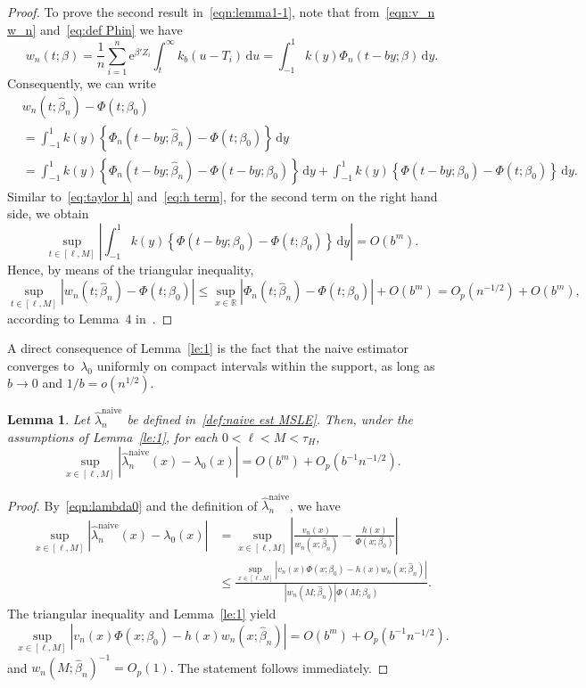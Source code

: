 \documentclass[11pt,reqno]{amsart}
\theoremstyle{definition}
\theoremstyle{plain}
\newtheorem{lemma}[de]{Lemma}
\theoremstyle{remark}
\begin{document}
\begin{proof}
To prove the second result in~\eqref{eqn:lemma1-1}, note that from~\eqref{eqn:v_n w_n} and~\eqref{eq:def Phin} we have
\begin{equation}
\label{eqn:w}
w_n(t;\beta)
=
\frac{1}{n}\sum_{i=1}^n
\mathrm{e}^{\beta'Z_i}\int_{t}^\infty k_b(u-T_i)\,\mathrm{d}u
=
\int_{-1}^1 k(y)\Phi_n(t-by;\beta)\,\mathrm{d}y.
\end{equation}
Consequently, we can write
\[
\begin{split}
&
w_n(t;\hat{\beta}_n)-\Phi(t;\beta_0)\\
&=
\int_{-1}^1 k(y)\left\{\Phi_n(t-by;\hat{\beta}_n)-\Phi(t;\beta_0)\right\}\,\mathrm{d}y\\
&=
\int_{-1}^1 k(y)
\left\{
\Phi_n(t-by;\hat{\beta}_n)-\Phi(t-by;\beta_0)
\right\}
\,\mathrm{d}y
+
\int_{-1}^1 k(y)
\left\{
\Phi(t-by;\beta_0)-\Phi(t;\beta_0)
\right\}
\,\mathrm{d}y.
\end{split}
\]
Similar to~\eqref{eq:taylor h} and~\eqref{eq:h term}, for the second term on the right hand side, we obtain
\[
\sup_{t\in[\ell,M]}
\left|
\int_{-1}^1 k(y)
\left\{
\Phi(t-by;\beta_0)-\Phi(t;\beta_0)
\right\}
\,\mathrm{d}y
\right|
=
O(b^m).
\]
Hence, by means of the triangular inequality,
\[
\sup_{t\in[\ell,M]}
\left|w_n(t;\hat{\beta}_n)-\Phi(t;\beta_0)\right|
\leq
\sup_{x\in{\mathbb{R}}}
\left|\Phi_n(t;\hat{\beta}_n)-\Phi(t;\beta_0)\right|
+
O(b^m)
=
O_p(n^{-1/2})+O(b^m),
\]
according to Lemma~4 in~\cite{LopuhaaNane2013}.
\end{proof}
A direct consequence of Lemma~\ref{le:1} is the fact that the naive estimator converges to~$\lambda_0$ uniformly on
compact intervals within the support, as long as $b\to0$ and $1/b=o(n^{1/2})$.
\begin{lemma}
\label{lem:cons-naive}
Let $\hat{\lambda}_n^{\mathrm{naive}}$ be defined in~\eqref{def:naive est MSLE}.
Then, under the assumptions of Lemma~\ref{le:1}, for each $0<\ell<M<\tau_H$,
\[
\sup_{x\in[\ell,M]}|\hat{\lambda}_n^{\mathrm{naive}}(x)-\lambda_0(x)|
=
O(b^{m})+O_p(b^{-1}n^{-1/2}).
\]
\end{lemma}
\begin{proof}
By~\eqref{eqn:lambda0} and the definition of $\hat{\lambda}_n^{\mathrm{naive}}$, we have
\[
\begin{split}
\sup_{x\in[\ell,M]}|\hat{\lambda}_n^{\mathrm{naive}}(x)-\lambda_0(x)|
&=
\sup_{x\in[\ell,M]}\left|\frac{v_n(x)}{w_n(x;\hat{\beta}_n)}-\frac{h(x)}{\Phi(x;\beta_0)}\right|\\
&\leq
\frac{\sup_{x\in[\ell,M]}\left|v_n(x)\Phi(x;\beta_0)-h(x)w_n(x;\hat{\beta}_n)\right|}{|w_n(M;\hat{\beta}_n)|\Phi(M;\beta_0)}.
\end{split}
\]
The triangular inequality and Lemma~\ref{le:1} yield
\[
\sup_{x\in[\ell,M]}\left|v_n(x)\Phi(x;\beta_0)-h(x)w_n(x;\hat{\beta}_n)\right|=O(b^{m})+O_p(b^{-1}n^{-1/2}).
\]
and $w_n(M;\hat{\beta}_n)^{-1}=O_p(1).$
The statement follows immediately.
\end{proof}
\end{document}
